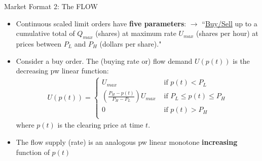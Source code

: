 \documentclass[10pt]{beamer}
\begin{document}
\begin{frame}{Market Format 2: The FLOW}
    \begin{itemize}
\item Continuous scaled limit orders have \textbf{five parameters}: $\rightarrow$ ``\underline{Buy/Sell} up to a cumulative total of  \underline{$Q_{max}$} (shares) at maximum rate \underline{$U_{max}$} (shares per hour) at prices between \underline{$P_{L}$} and \underline{$P_{H}$} (dollars per share)."
\item Consider a buy order. The (buying rate or) flow demand $U(p(t))$ is the decreasing pw linear function:
\begin{align}
                U{(p(t))}=
                \begin{cases}
                    U_{max} & \text{ if } p{(t)} < P_{L} \\
                    (\frac{P_{H}-p(t)}{P_{H}-P_{L}})U_{max} & \text{ if } P_L \leq p{(t)} \leq P_H \\
                    0  & \text{ if } p{(t)} > P_{H} \\
                \end{cases}
\end{align}
        where $p(t)$ is the clearing price at time $t$.
\item The flow supply (rate) is an analogous pw linear monotone \textbf{increasing} function of $p(t)$
    \end{itemize}
\end{frame}
\end{document}
